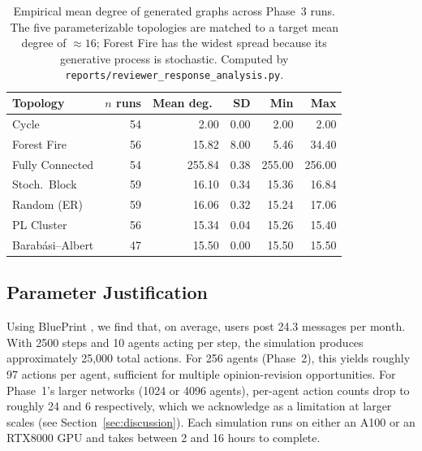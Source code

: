 \documentclass[11pt]{article}
\begin{document}
\begin{table}[h]
\centering
\small
\begin{tabular}{l r r r r r}
\toprule
Topology & $n$ runs & Mean deg.\ & SD & Min & Max \\
\midrule
Cycle           & 54 &   2.00 & 0.00 &   2.00 &   2.00 \\
Forest Fire     & 56 &  15.82 & 8.00 &   5.46 &  34.40 \\
Fully Connected & 54 & 255.84 & 0.38 & 255.00 & 256.00 \\
Stoch.\ Block   & 59 &  16.10 & 0.34 &  15.36 &  16.84 \\
Random (ER)     & 59 &  16.06 & 0.32 &  15.24 &  17.06 \\
PL Cluster      & 56 &  15.34 & 0.04 &  15.26 &  15.40 \\
Barab\'{a}si--Albert & 47 &  15.50 & 0.00 &  15.50 &  15.50 \\
\bottomrule
\end{tabular}
\caption{Empirical mean degree of generated graphs across Phase~3 runs. The five parameterizable topologies are matched to a target mean degree of $\approx 16$; Forest Fire has the widest spread because its generative process is stochastic. Computed by \texttt{reports/reviewer\_response\_analysis.py}.}
\label{tab:density_summary}
\end{table}

\subsection{Parameter Justification} 
\label{appendix:parameter_justification}
Using BluePrint \cite{bückkaeffer2025textttblueprintsocialmediauser}, we find that, on average, users post 24.3 messages per month. With 2500 steps and 10 agents acting per step, the simulation produces approximately 25,000 total actions. For 256 agents (Phase~2), this yields roughly 97 actions per agent, sufficient for multiple opinion-revision opportunities. For Phase~1's larger networks (1024 or 4096 agents), per-agent action counts drop to roughly 24 and 6 respectively, which we acknowledge as a limitation at larger scales (see Section~\ref{sec:discussion}). Each simulation runs on either an A100 or an RTX8000 GPU and takes between 2 and 16 hours to complete.
\end{document}
